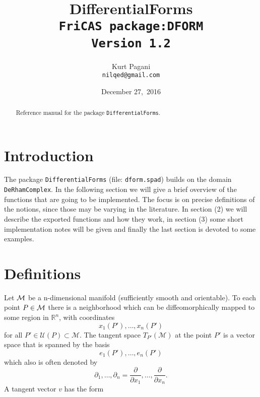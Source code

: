 \documentclass[12pt,a4paper]{article}
\author{Kurt Pagani \\ {\tt nilqed@gmail.com}}
\date{December 27,\ 2016}
\title{DifferentialForms \\ {\small\tt FriCAS package:DFORM \\ Version 1.2}}
\newcommand{\RR}[1]{\mathbb{R}^{#1}}
\begin{document}
\maketitle
%
\begin{abstract}
Reference manual for the package {\tt DifferentialForms}.
\end{abstract}
%
\tableofcontents
%
\section{Introduction}
The package {\tt DifferentialForms} (file: {\tt dform.spad}) builds on the
domain {\tt DeRhamComplex}. In the following section we will give a brief 
overview of the functions that are going to be implemented. The focus is 
on precise definitions of the notions, since those may be varying in the 
literature. In section (2) we will describe the exported functions and 
how they work, in section (3) some short implementation notes will be 
given and finally the last section is devoted to some examples.
%
\section{Definitions}
Let ${\cal M}$ be a n-dimensional manifold (sufficiently smooth and orientable). 
To each point $P\in{\cal M}$ there is a neighborhood which can be 
diffeomorphically mapped to some region in $\RR n$, with coordinates
\begin{displaymath}
   x_1 (P'), \ldots, x_n (P')
\end{displaymath}
for all $P' \in \mathcal{U} (P) \subset \mathcal{M}$. The tangent space
$T_{P'} (\mathcal{M})$ at the point $P'$ is a vector space that 
is spanned by the basis
\begin{displaymath}
    e_1 (P'), \ldots, e_n (P')
\end{displaymath}
which also is often denoted by 
\begin{displaymath}
   \partial_1, \ldots, \partial_n =
   \frac{\partial}{\partial x_1}, \ldots, 
   \frac{\partial}{\partial x_n}.  
\end{displaymath}
A tangent vector $v$ has the form
\end{document}
